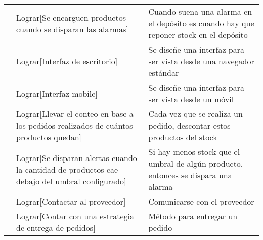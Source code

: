 \documentclass[a4paper]{article}
\begin{document}
\begin{table}[h]
\begin{tabular}{p{2cm} p{7cm} p{8cm}}

\rule{0pt}{1.2em} & Lograr[Se encarguen productos cuando se disparan las alarmas] & Cuando suena una alarma en el depósito es cuando hay que reponer stock en el depósito\\[0.2em]

\rule{0pt}{1.2em} & Lograr[Interfaz de escritorio] & Se diseñe una interfaz para ser vista desde una navegador estándar\\[0.2em]

\rule{0pt}{1.2em} & Lograr[Interfaz mobile] & Se diseñe una interfaz para ser vista desde un móvil\\[0.2em]

\rule{0pt}{1.2em} & Lograr[Llevar el conteo en base a los pedidos realizados de cuántos productos quedan] & Cada vez que se realiza un pedido, descontar estos productos del stock\\[0.2em]

\rule{0pt}{1.2em} & Lograr[Se disparan alertas cuando la cantidad de productos cae debajo del umbral configurado] & Si hay menos stock que el umbral de algún producto, entonces se dispara una alarma\\[0.2em]

\rule{0pt}{1.2em} & Lograr[Contactar al proveedor] & Comunicarse con el proveedor\\[0.2em]

\rule{0pt}{1.2em} & Lograr[Contar con una estrategia de entrega de pedidos] & Método para entregar un pedido\\[0.2em]

\end{tabular}
\end{table}
\end{document}
